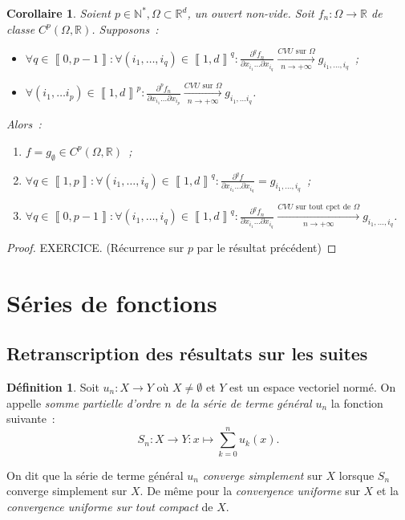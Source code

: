 \documentclass{report}
\newtheorem{cor}[thm]{Corollaire}
\theoremstyle{definition}
\newtheorem{déf}[thm]{Définition}
\theoremstyle{remark}
\newcommand{\R}{\mathbb R}
\newcommand{\N}{\mathbb N}
\newcommand{\CONV}[5]{\xrightarrow[#2 \to #3]{#4 \text{ #5 } #1}}
\newcommand{\CVU}[3]{\CONV{#1}{#2}{#3}{CVU}{sur}}
\newcommand{\CVUc}[3]{\CONV{#1}{#2}{#3}{CVU}{sur tout cpct de}}
\newcommand{\intint}[2]{\left\llbracket#1, #2\right\rrbracket}
\newcommand{\pinfty}{{+\infty}}
\newcommand{\evn}{espace vectoriel normé}
\begin{document}
			\begin{cor} Soient $p \in \N^*, \Omega \subset \R^d$, un ouvert non-vide. Soit $f_n : \Omega \to \R$ de classe $C^p(\Omega, \R)$. Supposons~:
			\begin{itemize}
				\item $\displaystyle \forall q \in \intint 0{p-1} : \forall (i_1, \ldots, i_q) \in \intint 1d^q :
					\frac {\partial^qf_n}{\partial x_{i_1}\ldots\partial x_{i_q}} \CVU \Omega n\pinfty g_{i_1, \ldots, i_q}$~;
				\item $\displaystyle \forall (i_1, \ldots i_p) \in \intint 1d^p :
					\frac {\partial^pf_n}{\partial x_{i_1}\ldots\partial x_{i_p}} \CVU \Omega n\pinfty g_{i_1, \ldots i_q}$.
			\end{itemize}
			Alors~:
			\begin{enumerate}
				\item $f = g_\emptyset \in C^p(\Omega, \R)$~;
				\item $\displaystyle \forall q \in \intint 1p : \forall (i_1, \ldots, i_q) \in \intint 1d^q :
					\frac {\partial^qf}{\partial x_{i_1}\ldots\partial x_{i_q}} = g_{i_1, \ldots, i_q}$~;
				\item $\forall q \in \intint 0{p-1} : \forall (i_1, \ldots, i_q) \in \intint 1d^q :
					\frac {\partial^qf_n}{\partial x_{i_1}\ldots\partial x_{i_q}} \CVUc \Omega n\pinfty g_{i_1, \ldots, i_q}$.
			\end{enumerate}
			\end{cor}

			\begin{proof} EXERCICE. (Récurrence sur $p$ par le résultat précédent)
			\end{proof}

	\section{Séries de fonctions}
		\subsection{Retranscription des résultats sur les suites}
			\begin{déf} Soit $u_n : X \to Y$ où $X \neq \emptyset$ et $Y$ est un \evn. On appelle \textit{somme partielle d'ordre $n$ de la série de terme
			général $u_n$} la fonction suivante~:
			\[S_n : X \to Y : x \mapsto \sum_{k=0}^nu_k(x).\]

			On dit que la série de terme général $u_n$ \textit{converge simplement} sur $X$ lorsque $S_n$ converge simplement sur $X$. De même pour la
			\textit{convergence uniforme} sur $X$ et la \textit{convergence uniforme sur tout compact} de $X$.
			\end{déf}
\end{document}
